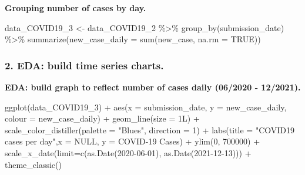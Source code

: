 \documentclass[
]{article}
\newenvironment{Shaded}{\begin{snugshade}}{\end{snugshade}}
\newcommand{\AttributeTok}[1]{\textcolor[rgb]{0.77,0.63,0.00}{#1}}
\newcommand{\ConstantTok}[1]{\textcolor[rgb]{0.00,0.00,0.00}{#1}}
\newcommand{\DecValTok}[1]{\textcolor[rgb]{0.00,0.00,0.81}{#1}}
\newcommand{\FunctionTok}[1]{\textcolor[rgb]{0.00,0.00,0.00}{#1}}
\newcommand{\NormalTok}[1]{#1}
\newcommand{\OtherTok}[1]{\textcolor[rgb]{0.56,0.35,0.01}{#1}}
\newcommand{\SpecialCharTok}[1]{\textcolor[rgb]{0.00,0.00,0.00}{#1}}
\newcommand{\StringTok}[1]{\textcolor[rgb]{0.31,0.60,0.02}{#1}}
\begin{document}
\textbf{Grouping number of cases by day.}

\begin{Shaded}
\begin{Highlighting}[]
\NormalTok{data\_COVID19\_3 }\OtherTok{\textless{}{-}}\NormalTok{ data\_COVID19\_2 }\SpecialCharTok{\%\textgreater{}\%}
  \FunctionTok{group\_by}\NormalTok{(submission\_date) }\SpecialCharTok{\%\textgreater{}\%}
  \FunctionTok{summarize}\NormalTok{(}\AttributeTok{new\_case\_daily =} \FunctionTok{sum}\NormalTok{(new\_case, }\AttributeTok{na.rm =} \ConstantTok{TRUE}\NormalTok{))}
\end{Highlighting}
\end{Shaded}

\hypertarget{eda-build-time-series-charts.}{%
\subsubsection{2. EDA: build time series
charts.}\label{eda-build-time-series-charts.}}

\textbf{EDA: build graph to reflect number of cases daily (06/2020 -
12/2021).}

\begin{Shaded}
\begin{Highlighting}[]
\FunctionTok{ggplot}\NormalTok{(data\_COVID19\_3) }\SpecialCharTok{+}
  \FunctionTok{aes}\NormalTok{(}\AttributeTok{x =}\NormalTok{ submission\_date, }\AttributeTok{y =}\NormalTok{ new\_case\_daily, }\AttributeTok{colour =}\NormalTok{ new\_case\_daily) }\SpecialCharTok{+}
  \FunctionTok{geom\_line}\NormalTok{(}\AttributeTok{size =}\NormalTok{ 1L) }\SpecialCharTok{+}
  \FunctionTok{scale\_color\_distiller}\NormalTok{(}\AttributeTok{palette =} \StringTok{"Blues"}\NormalTok{, }\AttributeTok{direction =} \DecValTok{1}\NormalTok{) }\SpecialCharTok{+}
  \FunctionTok{labs}\NormalTok{(}\AttributeTok{title =} \StringTok{"COVID19 cases per day"}\NormalTok{,}\AttributeTok{x =} \ConstantTok{NULL}\NormalTok{, }\AttributeTok{y =} \StringTok{\textquotesingle{}COVID{-}19 Cases\textquotesingle{}}\NormalTok{) }\SpecialCharTok{+}
  \FunctionTok{ylim}\NormalTok{(}\DecValTok{0}\NormalTok{, }\DecValTok{700000}\NormalTok{) }\SpecialCharTok{+}
  \FunctionTok{scale\_x\_date}\NormalTok{(}\AttributeTok{limit=}\FunctionTok{c}\NormalTok{(}\FunctionTok{as.Date}\NormalTok{(}\StringTok{\textquotesingle{}2020{-}06{-}01\textquotesingle{}}\NormalTok{), }\FunctionTok{as.Date}\NormalTok{(}\StringTok{\textquotesingle{}2021{-}12{-}13\textquotesingle{}}\NormalTok{))) }\SpecialCharTok{+}
  \FunctionTok{theme\_classic}\NormalTok{()}
\end{Highlighting}
\end{Shaded}
\end{document}
